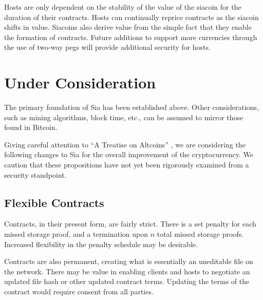 \documentclass[twocolumn]{article}
\begin{document}
Hosts are only dependent on the stability of the value of the siacoin for the duration of their contracts.
Hosts can continually reprice contracts as the siacoin shifts in value.
Siacoins also derive value from the simple fact that they enable the formation of contracts.
Future additions to support more currencies through the use of two-way pegs will provide additional security for hosts.

\section{Under Consideration}
The primary foundation of Sia has been established above.
Other considerations, such as mining algorithms, block time, etc., can be assumed to mirror those found in Bitcoin.

Giving careful attention to ``A Treatise on Altcoins'' \cite{alts}, we are considering the following changes to Sia for the overall improvement of the cryptocurrency.
We caution that these propositions have not yet been rigorously examined from a security standpoint.

\subsection{Flexible Contracts}
Contracts, in their present form, are fairly strict.
There is a set penalty for each missed storage proof, and a termination upon $n$ total missed storage proofs.
Increased flexibility in the penalty schedule may be desirable.

Contracts are also permanent, creating what is essentially an uneditable file on the network.
There may be value in enabling clients and hosts to negotiate an updated file hash or other updated contract terms.
Updating the terms of the contract would require consent from all parties.


\end{document}
